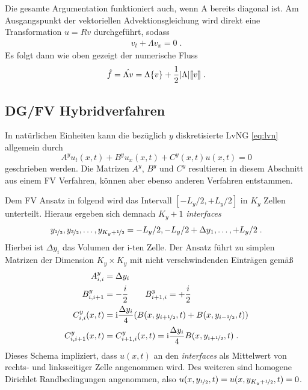 Die gesamte Argumentation funktioniert auch, wenn A bereits diagonal ist. Am Ausgangspunkt der vektoriellen Advektionsgleichung wird direkt eine Transformation $u=Rv$ durchgeführt, sodass
\begin{align}
  v_t + \Lambda v_x = 0 \; .
\end{align}
Es folgt dann wie oben gezeigt der numerische Fluss
\begin{align}
  \hat{f} = \hat{\Lambda v} = \Lambda\{ v \} + \frac{1}{2}|\Lambda|\llbracket v \rrbracket \; .
  \label{eq:FLUX}
\end{align}


\subsection{DG/FV Hybridverfahren}\label{sec:Hybridverfahren}
In natürlichen Einheiten kann die bezüglich $y$ diskretisierte LvNG \eqref{eq:lvn} allgemein durch
\begin{equation}
  {A}^y u_t(x,t) + {B}^y u_x(x,t) + {C}^y(x,t)u(x,t) = 0
  \label{eq:qschema}
\end{equation}
geschrieben werden. Die Matrizen  ${A}^y$, ${B}^y$ und ${C}^y$ resultieren in diesem Abschnitt aus einem FV Verfahren, können aber ebenso anderen Verfahren entstammen.

Dem FV Ansatz in \cite{lukas1} folgend wird das Intervall ${[-L_y/2,+L_y/2]}$ in $K_y$ Zellen unterteilt. Hieraus ergeben sich demnach $K_y+1$ \emph{interfaces}
\begin{equation*}
  {y_{\nicefrac{1}{2}}, y_{\nicefrac{3}{2}}, \dots, y_{K_y + \nicefrac{1}{2}} = -L_y/2, -L_y/2+\Delta y_1,\dots,+L_y/2} \; .
\end{equation*}
Hierbei ist $\Delta y_i$ das Volumen der i-ten Zelle. Der Ansatz führt zu simplen Matrizen der Dimension ${K_y\times K_y}$ mit nicht verschwindenden Einträgen gemäß
\begin{equation}
  \begin{aligned}
  {A}^y_{i,i} &= \Delta y_i \\
  {B}^y_{i,i+1} &= -\frac{i}{2} \qquad
  {B}^y_{i+1, i} = +\frac{i}{2}  \\
  {C}^y_{i,i}(x,t) &= \mathrm{i} \frac{\Delta y_i}{4} (B(x, y_{i+\nicefrac{1}{2}},t) + B(x, y_{i-\nicefrac{1}{2}},t))  \\
  {C}^y_{i,i+1}(x,t) &= C^y_{i+1,i}(x,t) = \mathrm{i} \frac{\Delta y_i}{4} B(x, y_{i+\nicefrac{1}{2}},t)  \; .
  \end{aligned}
  \label{eq:ABC}
\end{equation}
Dieses Schema impliziert, dass $u(x,t)$ an den \emph{interfaces} als Mittelwert von rechts- und linksseitiger Zelle angenommen wird. Des weiteren sind  homogene Dirichlet Randbedingungen angenommen, also ${u(x,y_{\nicefrac{1}{2}}, t) = u(x,y_{K_y+\nicefrac{1}{2}}, t) = 0}$.

